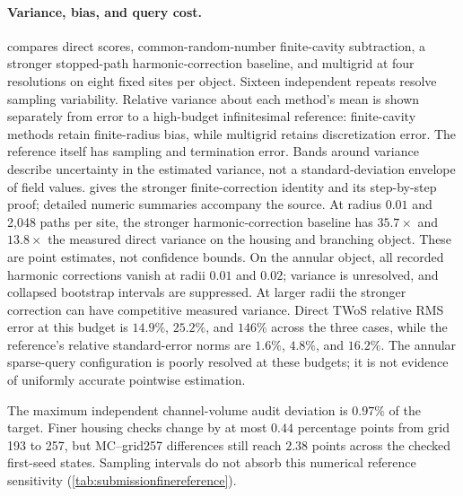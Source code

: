 \paragraph{Variance, bias, and query cost.}
 compares direct scores, common-random-number
finite-cavity subtraction, a stronger stopped-path harmonic-correction
baseline, and multigrid at four resolutions on eight fixed sites per object.
Sixteen independent repeats resolve sampling variability. Relative variance
about each method's mean is shown separately from error to a high-budget
infinitesimal reference: finite-cavity methods retain finite-radius bias,
while multigrid retains discretization error. The reference itself has
sampling and termination error. Bands around variance describe uncertainty
in the estimated variance, not a standard-deviation envelope of field values.
 gives the stronger finite-correction identity and
its step-by-step proof; detailed numeric summaries accompany the source.
At radius $0.01$ and 2,048 paths per site, the stronger harmonic-correction
baseline has $35.7\times$ and $13.8\times$ the measured direct variance on
the housing and branching object. These are point estimates, not confidence
bounds. On the annular object, all recorded harmonic corrections vanish at
radii $0.01$ and $0.02$; variance is unresolved, and collapsed bootstrap
intervals are suppressed. At larger radii the stronger correction can have
competitive measured variance. Direct TWoS relative RMS error at this budget
is $14.9\%$, $25.2\%$, and $146\%$ across the three cases, while the
reference's relative standard-error norms are $1.6\%$, $4.8\%$, and
$16.2\%$. The annular sparse-query configuration is poorly resolved at these
budgets; it is not evidence of uniformly accurate pointwise estimation.

The maximum independent channel-volume audit deviation is $0.97\%$ of the
target. Finer housing checks change by at most $0.44$ percentage points from
grid 193 to 257, but MC--grid257 differences still reach $2.38$ points across
the checked first-seed states. Sampling intervals do not absorb this numerical
reference sensitivity (\cref{tab:submissionfinereference}).

